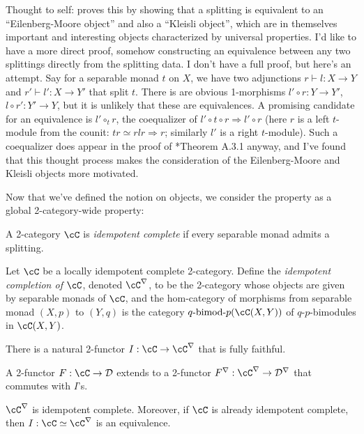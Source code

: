 \documentclass[12pt]{article}
\newcommand{\cD}{{\mathcal{D}}}
\newcommand{\bimod}[2]{{#1\textrm{-bimod-}#2}}
\begin{document}
Thought to self:
\cite{DRfusion} proves this by showing that
a splitting is equivalent
to an ``Eilenberg-Moore object'' and also a ``Kleisli object'',
which are in themselves important and interesting objects
characterized by universal properties.
I'd like to have a more direct proof,
somehow constructing an equivalence between any two splittings
directly from the splitting data.
I don't have a full proof, but here's an attempt.
Say for a separable monad $t$ on $X$,
we have two adjunctions $r \vdash l : X \to Y$
and $r' \vdash l' : X \to Y'$
that split $t$.
There is are obvious 1-morphisms $l' \circ r: Y \to Y'$,
$l \circ r': Y' \to Y$,
but it is unlikely that these are equivalences.
A promising candidate for an equivalence
is $l' \circ_t r$, the coequalizer of
$l' \circ t \circ r \Rightarrow l' \circ r$
(here $r$ is a left $t$-module from the counit:
$tr \simeq rlr \Rightarrow r$;
similarly $l'$ is a right $t$-module).
Such a coequalizer does appear in the proof of
\cite{DRfusion}*{Theorem A.3.1} anyway,
and I've found that this thought process
makes the consideration of the Eilenberg-Moore and Kleisli
objects more motivated.


Now that we've defined the notion on objects,
we consider the property as a global 2-category-wide property:


\begin{definition}
A 2-category $\cC$ is \emph{idempotent complete}
if every separable monad admits a splitting.
\end{definition}

\begin{definition}
Let $\cC$ be a locally idempotent complete 2-category.
Define the \emph{idempotent completion of $\cC$},
denoted $\cC^\nabla$, to be the 2-category whose objects
are given by separable monads of $\cC$,
and the hom-category of morphisms from
separable monad $(X,p)$ to $(Y,q)$
is the category $\bimod{q}{p}(\cC(X,Y))$
of $q$-$p$-bimodules in $\cC(X,Y)$.

There is a natural 2-functor $I: \cC \to \cC^\nabla$
that is fully faithful.

A 2-functor $F: \cC \to \cD$
extends to a 2-functor $F^\nabla: \cC^\nabla \to \cD^\nabla$
that commutes with $I$'s.
\end{definition}


\begin{proposition}
$\cC^\nabla$ is idempotent complete.
Moreover, if $\cC$ is already idempotent complete,
then $I: \cC \simeq \cC^\nabla$ is an equivalence.
\end{proposition}
\end{document}
